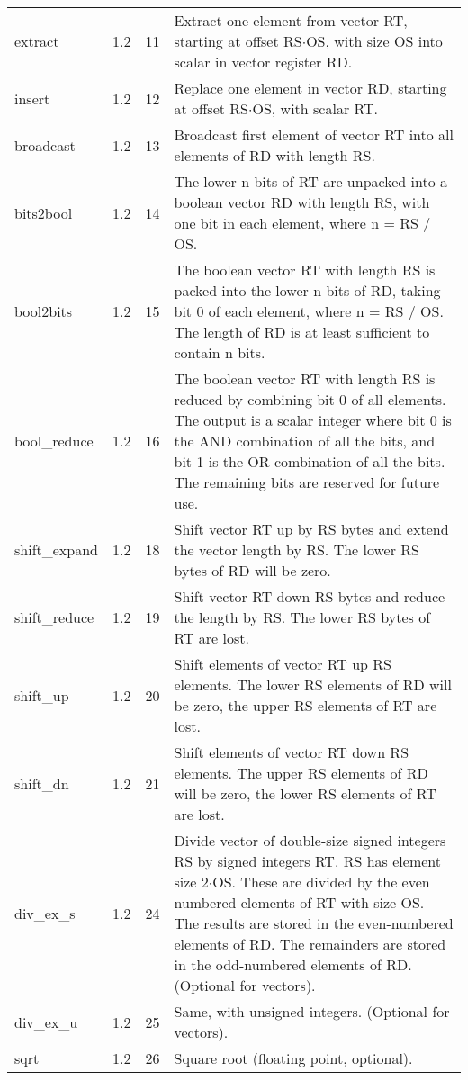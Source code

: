 \documentclass[forwardcom.tex]{subfiles}
\begin{document}
\begin{longtable} {|p{20mm}|p{10mm}|p{8mm}|p{75mm}|}
extract       & 1.2 & 11 & Extract one element from vector RT, starting at offset RS$\cdot$OS, with size OS into scalar in vector register RD. \\
insert        & 1.2 & 12 & Replace one element in vector RD, starting at offset RS$\cdot$OS, with scalar RT. \\
broadcast     & 1.2 & 13 & Broadcast first element of vector RT into all elements of RD with length RS. \\
bits2bool     & 1.2 & 14 & The lower n bits of RT are unpacked into a boolean vector RD with length RS, with one bit in each element, where n = RS / OS. \\
bool2bits     & 1.2 & 15 & The boolean vector RT with length RS is packed into the lower n bits of RD, taking bit 0 of each element, where n = RS / OS. The
length of RD is at least sufficient to contain n bits. \\
bool\_reduce  & 1.2 & 16 & The boolean vector RT with length RS is reduced by combining bit 0 of all elements. The output is a scalar integer where bit 0 is the
AND combination of all the bits, and bit 1 is the OR combination of
all the bits. The remaining bits are reserved for future use. \\
shift\_expand & 1.2 & 18 & Shift vector RT up by RS bytes and extend the vector length by RS. The lower RS bytes of RD will be zero. \\
shift\_reduce & 1.2 & 19 & Shift vector RT down RS bytes and reduce the length by RS. The lower RS bytes of RT are lost. \\
shift\_up      & 1.2 & 20 & Shift elements of vector RT up RS elements. The lower RS elements of RD will be zero, the upper RS elements of RT are lost. \\
shift\_dn      & 1.2 & 21 & Shift elements of vector RT down RS elements. The upper RS
elements of RD will be zero, the lower RS elements of RT are lost. \\
div\_ex\_s     & 1.2 & 24 & Divide vector of double-size signed integers RS by signed integers RT. RS has element size 2$\cdot$OS. These are divided by the even numbered
elements of RT with size OS. The results are stored in
the even-numbered elements of RD. The remainders are stored in
the odd-numbered elements of RD. (Optional for vectors). \\
div\_ex\_u    & 1.2 & 25 & Same, with unsigned integers. (Optional for vectors). \\
sqrt          & 1.2 & 26 & Square root (floating point, optional). \\

\end{longtable}
\end{document}
